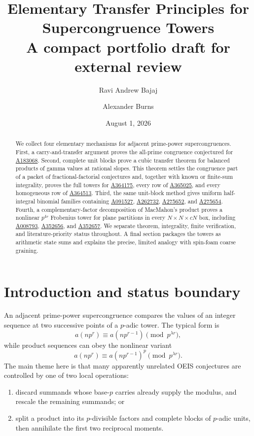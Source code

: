 \documentclass[11pt]{article}
\title{Elementary Transfer Principles for Supercongruence Towers\\
\large A compact portfolio draft for external review}
\author{Ravi Andrew Bajaj \and Alexander Burns}
\date{August 1, 2026}
\theoremstyle{definition}
\newcommand{\OEIS}[1]{\href{https://oeis.org/#1}{#1}}
\begin{document}
\maketitle

\begin{center}
\end{center}

\begin{abstract}
We collect four elementary mechanisms for adjacent prime-power
supercongruences.  First, a carry-and-transfer argument proves the
all-prime congruence conjectured for \OEIS{A183068}.  Second, complete
unit blocks prove a cubic transfer theorem for balanced products of gamma
values at rational slopes.  This theorem settles the congruence part of a
packet of fractional-factorial conjectures and, together with known or
finite-sum integrality, proves the full towers for \OEIS{A364175}, every
row of \OEIS{A365025}, and every homogeneous row of \OEIS{A364513}.
Third, the same unit-block method gives uniform half-integral binomial
families containing \OEIS{A091527}, \OEIS{A262732}, \OEIS{A275652}, and
\OEIS{A275654}.  Fourth, a complementary-factor decomposition of
MacMahon's product proves a nonlinear $p^{4r}$ Frobenius tower for plane
partitions in every $N\times N\times cN$ box, including \OEIS{A008793},
\OEIS{A352656}, and \OEIS{A352657}.  We separate theorem, integrality,
finite verification, and literature-priority status throughout.  A final
section packages the towers as arithmetic state sums and explains the
precise, limited analogy with spin-foam coarse graining.
\end{abstract}

\tableofcontents

\section{Introduction and status boundary}

An adjacent prime-power supercongruence compares the values of an integer
sequence at two successive points of a $p$-adic tower.  The typical form is
\[
 a(np^r)\equiv a(np^{r-1})\pmod {p^{\lambda r}},
\]
while product sequences can obey the nonlinear variant
\[
 a(np^r)\equiv a(np^{r-1})^p\pmod {p^{\lambda r}}.
\]
The main theme here is that many apparently unrelated OEIS conjectures are
controlled by one of two local operations:
\begin{enumerate}
\item discard summands whose base-$p$ carries already supply the modulus,
      and rescale the remaining summands; or
\item split a product into its $p$-divisible factors and complete blocks of
      $p$-adic units, then annihilate the first two reciprocal moments.
\end{enumerate}
\end{document}
